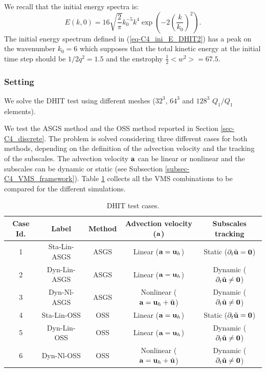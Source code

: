 We recall that the initial energy spectra is:
\begin{equation}
\label{eq-C4_ini_E_DHIT2}
E(k,0)=16\sqrt{\frac{2}{\pi}}k_0^{-5}k^4\exp\left(-2\left(\frac{k}{k_0}\right)^2\right).
\end{equation}
The initial energy spectrum defined in (\ref{eq-C4_ini_E_DHIT2}) has a peak on the wavenumber $k_0=6$ which supposes that the total kinetic energy at the initial time step should be $1/2q^2=1.5$ and the enstrophy $\frac{1}{2}<w^2>=67.5$.

\subsubsection{Setting}
\label{subsubsec-C4_DHIT_setting}
We solve the DHIT test using different meshes ($32^3$, $64^3$ and $128^3$ $Q_1/Q_1$ elements). 

We test the ASGS method and the OSS method reported in Section \ref{sec-C4_discrete}. The problem is solved considering three different cases for both methods, depending on the definition of the advection velocity and the tracking of the subscales. The advection velocity ${\bf a}$ can be linear or nonlinear and the subscales can be dynamic or static (see Subsection \ref{subsec-C4_VMS_framework}). Table \ref{table:DHIT_cases} collects all the VMS combinations to be compared for the different simulations.

\begin{table}[h]
\centering
\begin{tabular}{ccccc}
\hline
Case Id.&Label&Method&Advection velocity (${\bf a}$)&Subscales tracking\\
\hline
1&Sta-Lin-ASGS&ASGS&Linear (${\bf a}={\bf u}_h$)&Static ($\partial_t\tilde{{\bf u}} = {\bf 0}$)\\
2&Dyn-Lin-ASGS&ASGS&Linear (${\bf a}={\bf u}_h$)&Dynamic ($\partial_t\tilde{{\bf u}} \not = {\bf 0}$)\\
3&Dyn-Nl-ASGS&ASGS&Nonlinear (${\bf a}={\bf u}_h+\tilde{{\bf u}}$)&Dynamic ($\partial_t\tilde{{\bf u}} \not = {\bf 0}$)\\
\hline
4&Sta-Lin-OSS&OSS&Linear (${\bf a}={\bf u}_h$)&Static ($\partial_t\tilde{{\bf u}} = {\bf 0}$)\\
5&Dyn-Lin-OSS&OSS&Linear (${\bf a}={\bf u}_h$)&Dynamic ($\partial_t\tilde{{\bf u}} \not = {\bf 0}$)\\
6&Dyn-Nl-OSS&OSS&Nonlinear (${\bf a}={\bf u}_h+\tilde{{\bf u}}$)&Dynamic ($\partial_t\tilde{{\bf u}} \not = {\bf 0}$)\\
\hline
\end{tabular}
\caption{DHIT test cases.}
\label{table:DHIT_cases}
\end{table}

